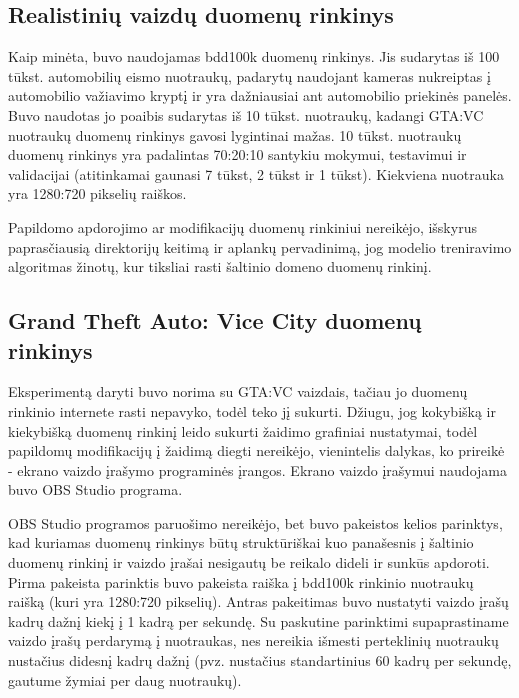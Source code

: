 \documentclass{VUMIFPSkursinis}
\begin{document}
\subsection{Realistinių vaizdų duomenų rinkinys}
Kaip minėta, buvo naudojamas bdd100k duomenų rinkinys. Jis sudarytas iš 100 tūkst. automobilių eismo nuotraukų, padarytų naudojant kameras nukreiptas į automobilio važiavimo kryptį ir yra dažniausiai ant automobilio priekinės panelės. Buvo naudotas jo poaibis sudarytas iš 10 tūkst. nuotraukų, kadangi GTA:VC nuotraukų duomenų rinkinys gavosi lygintinai mažas. 10 tūkst. nuotraukų duomenų rinkinys yra padalintas 70:20:10 santykiu mokymui, testavimui ir validacijai (atitinkamai gaunasi 7 tūkst, 2 tūkst ir 1 tūkst). Kiekviena nuotrauka yra 1280:720 pikselių raiškos.

Papildomo apdorojimo ar modifikacijų duomenų rinkiniui nereikėjo, išskyrus paprasčiausią direktorijų keitimą ir aplankų pervadinimą, jog modelio treniravimo algoritmas žinotų, kur tiksliai rasti šaltinio domeno duomenų rinkinį.
\subsection{Grand Theft Auto: Vice City duomenų rinkinys}
Eksperimentą daryti buvo norima su GTA:VC vaizdais, tačiau jo duomenų rinkinio internete rasti nepavyko, todėl teko jį sukurti. Džiugu, jog kokybišką ir kiekybišką duomenų rinkinį leido sukurti žaidimo grafiniai nustatymai, todėl papildomų modifikacijų į žaidimą diegti nereikėjo, vienintelis dalykas, ko prireikė - ekrano vaizdo įrašymo programinės įrangos. Ekrano vaizdo įrašymui naudojama buvo OBS Studio programa.

OBS Studio programos paruošimo nereikėjo, bet buvo pakeistos kelios parinktys, kad kuriamas duomenų rinkinys būtų struktūriškai kuo panašesnis į šaltinio duomenų rinkinį ir vaizdo įrašai nesigautų be reikalo dideli ir sunkūs apdoroti. Pirma pakeista parinktis buvo pakeista raiška į bdd100k rinkinio nuotraukų raišką (kuri yra 1280:720 pikselių). Antras pakeitimas buvo nustatyti vaizdo įrašų kadrų dažnį kiekį į 1 kadrą per sekundę. Su paskutine parinktimi supaprastiname vaizdo įrašų perdarymą į nuotraukas, nes nereikia išmesti perteklinių nuotraukų nustačius didesnį kadrų dažnį (pvz. nustačius standartinius 60 kadrų per sekundę, gautume žymiai per daug nuotraukų).
\end{document}
